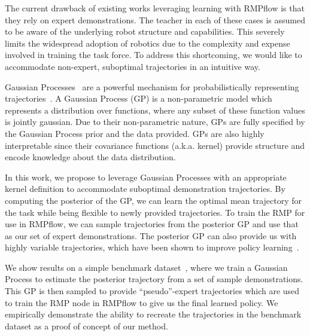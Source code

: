 The current drawback of existing works leveraging learning with RMPflow is that they rely on expert demonstrations. The teacher in each of these cases is assumed to be aware of the underlying robot structure and capabilities. This severely limits the widespread adoption of robotics due to the complexity and expense involved in training the task force. To address this shortcoming, we would like to accommodate non-expert, suboptimal trajectories in an intuitive way.

Gaussian Processes~\cite{Rasmussen04book} are a powerful mechanism for probabilistically representing trajectories~\cite{vanWaveren22manuscript}. A Gaussian Process (GP) is a non-parametric model which represents a distribution over functions, where any subset of these function values is jointly gaussian. Due to their non-parametric nature, GPs are fully specified by the Gaussian Process prior and the data provided. GPs are also highly interpretable since their covariance functions (a.k.a. kernel) provide structure and encode knowledge about the data distribution.

In this work, we propose to leverage Gaussian Processes with an appropriate kernel definition to accommodate suboptimal demonstration trajectories. By computing the posterior of the GP, we can learn the optimal mean trajectory for the task while being flexible to newly provided trajectories.
To train the RMP for use in RMPflow, we can sample trajectories from the posterior GP and use that as our set of expert demonstrations. The posterior GP can also provide us with highly variable trajectories, which have been shown to improve policy learning~\cite{Duan17neurips}.

We show results on a simple benchmark dataset~\cite{Khansari-Zadeh11tro}, where we train a Gaussian Process to estimate the posterior trajectory from a set of sample demonstrations. This GP is then sampled to provide ``pseudo''-expert trajectories which are used to train the RMP node in RMPflow to give us the final learned policy. We empirically demonstrate the ability to recreate the trajectories in the benchmark dataset as a proof of concept of our method.



